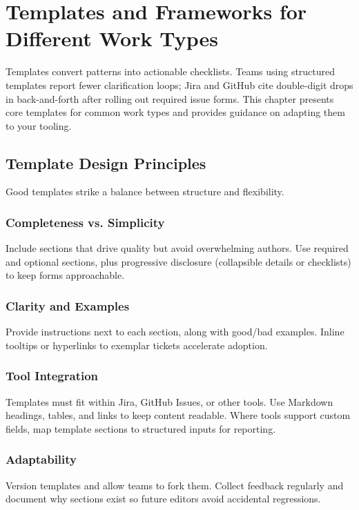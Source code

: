 \chapter{Templates and Frameworks for Different Work Types}
\label{ch:templates-frameworks}

Templates convert patterns into actionable checklists. Teams using structured templates report fewer clarification loops; Jira and GitHub cite double-digit drops in back-and-forth after rolling out required issue forms. This chapter presents core templates for common work types and provides guidance on adapting them to your tooling.

\section{Template Design Principles}
\label{sec:template-principles}

Good templates strike a balance between structure and flexibility.

\subsection{Completeness vs. Simplicity}
Include sections that drive quality but avoid overwhelming authors. Use required and optional sections, plus progressive disclosure (collapsible details or checklists) to keep forms approachable.

\subsection{Clarity and Examples}
Provide instructions next to each section, along with good/bad examples. Inline tooltips or hyperlinks to exemplar tickets accelerate adoption.

\subsection{Tool Integration}
Templates must fit within Jira, GitHub Issues, or other tools. Use Markdown headings, tables, and links to keep content readable. Where tools support custom fields, map template sections to structured inputs for reporting.

\subsection{Adaptability}
Version templates and allow teams to fork them. Collect feedback regularly and document why sections exist so future editors avoid accidental regressions.

